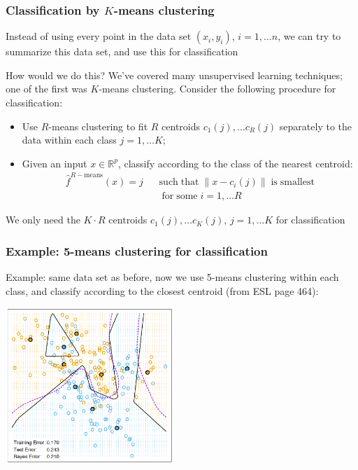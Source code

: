 \documentclass[mathserif]{beamer}
\def\R{\mathds{R}}
\def\red{\color[rgb]{0.8,0,0}}
\begin{document}
\begin{frame}
\frametitle{Classification by $K$-means clustering}
Instead of using every point in the data set $(x_i,y_i)$, $i=1,\ldots n$, we can
try to {\red summarize} this data set, and use this for classification

\bigskip
How would we do this? We've covered many unsupervised learning techniques; one of 
the first was {\red $K$-means clustering}. Consider the following procedure 
for classification:
\smallskip
\begin{itemize}
\item Use $R$-means clustering to fit $R$ centroids $c_1(j),\ldots c_R(j)$ 
separately to the data within each class $j=1,\ldots K$;
\item Given an input $x \in \R^p$, classify according to the class of the nearest
centroid:
\begin{align*}
\hat{f}^{R-\mathrm{means}}(x) = j \;\;\;&\mathrm{such}\;\mathrm{that}\;
\|x-c_i(j)\|\;\mathrm{is}\;\mathrm{smallest}\\
&\;\mathrm{for}\;\mathrm{some}\;i=1,\ldots R
\end{align*}
\end{itemize}

We only need the $K\cdot R$ centroids $c_1(j),\ldots c_K(j)$, 
$j=1,\ldots K$ for classification
\end{frame}

\begin{frame}
\frametitle{Example: 5-means clustering for classification}
\smallskip
\smallskip
Example: same data set as before, now we use 5-means clustering within
each class, and classify according to the closest centroid (from ESL page 464):
\begin{center}
\includegraphics[width=2.5in]{5m.png}
\end{center}
\end{frame}
\end{document}
